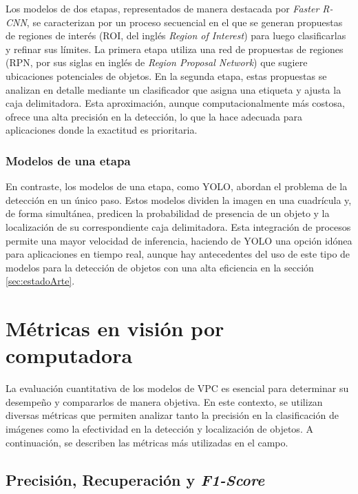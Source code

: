 Los modelos de dos etapas, representados de manera destacada por \textit{Faster R-CNN}, se caracterizan por un proceso secuencial en el que se generan propuestas de regiones de interés (ROI, del inglés \textit{Region of Interest}) para luego clasificarlas y refinar sus límites. La primera etapa utiliza una red de propuestas de regiones (RPN, por sus siglas en inglés de \textit{Region Proposal Network}) que sugiere ubicaciones potenciales de objetos. En la segunda etapa, estas propuestas se analizan en detalle mediante un clasificador que asigna una etiqueta y ajusta la caja delimitadora. Esta aproximación, aunque computacionalmente más costosa, ofrece una alta precisión en la detección, lo que la hace adecuada para aplicaciones donde la exactitud es prioritaria.

\subsubsection{Modelos de una etapa}

En contraste, los modelos de una etapa, como YOLO, abordan el problema de la detección en un único paso. Estos modelos dividen la imagen en una cuadrícula y, de forma simultánea, predicen la probabilidad de presencia de un objeto y la localización de su correspondiente caja delimitadora. Esta integración de procesos permite una mayor velocidad de inferencia, haciendo de YOLO una opción idónea para aplicaciones en tiempo real, aunque hay antecedentes del uso de este tipo de modelos para la detección de objetos con una alta eficiencia en la sección \ref{sec:estadoArte}.


\section{Métricas en visión por computadora} \label{sec:metricasVisPC}

La evaluación cuantitativa de los modelos de VPC es esencial para determinar su desempeño y compararlos de manera objetiva. En este contexto, se utilizan diversas métricas que permiten analizar tanto la precisión en la clasificación de imágenes como la efectividad en la detección y localización de objetos. A continuación, se describen las métricas más utilizadas en el campo.

\subsection{Precisión, Recuperación y \textit{F1-Score}}

